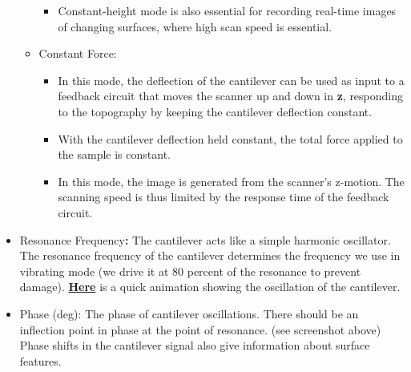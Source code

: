 \documentclass{../lab}
\begin{document}
\begin{itemize}
\begin{itemize}
\begin{itemize}
            \item Constant-height mode is also essential for recording real-time images of changing surfaces, where high scan speed is essential.

        \end{itemize}

        \item Constant Force:

        \begin{itemize}
            \item In this mode, the deflection of the cantilever can be used as input to a feedback circuit that moves the scanner up and down in \textbf{z}, responding to the topography by keeping the cantilever deflection constant.

            \item With the cantilever deflection held constant, the total force applied to the sample is constant.

            \item In this mode, the image is generated from the scanner’s z-motion. The scanning speed is thus limited by the response time of the feedback circuit.

        \end{itemize}

    \end{itemize}

    \item Resonance Frequency\textbf{:}  The cantilever acts like a simple harmonic oscillator. The resonance frequency of the cantilever determines the frequency we use in vibrating mode (we drive it at 80 percent of the resonance to prevent damage). \href{http://experimentationlab.berkeley.edu/sites/default/files/AFMImages/2.1.1.\%20Intro\%20Vibrating\%20Cantf.swf.mp4}{\textbf{Here}} is a quick animation showing the oscillation of the cantilever.

    \item Phase (deg): The phase of cantilever oscillations.  There should be an inflection point in phase at the point of resonance. (see screenshot above) Phase shifts in the cantilever signal also give information about surface features.


\end{itemize}
\end{document}

